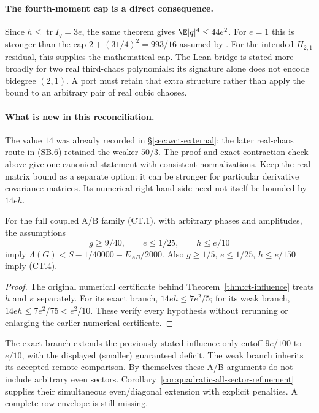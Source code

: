 \paragraph{The fourth-moment cap is a direct consequence.}
Since $h\le\operatorname{tr}I_q=3e$, the same theorem gives
$\E|q|^4\le44e^2$. For $e=1$ this is stronger than the cap
$2+(31/4)^2=993/16$ assumed by .
For the intended $H_{2,1}$ residual, this supplies the mathematical cap.
The Lean bridge is stated more broadly for two real third-chaos
polynomials: its signature alone does not encode bidegree $(2,1)$.
A port must retain that extra structure rather than apply the bound to
an arbitrary pair of real cubic chaoses.

\paragraph{What is new in this reconciliation.}
The value $14$ was already recorded in \S\ref{sec:wct-external}; the later
real-chaos route in (SB.6) retained the weaker $50/3$. The proof and exact
contraction check above give one canonical statement with consistent
normalizations. Keep the real-matrix bound as a separate option: it can
be stronger for particular derivative covariance matrices. Its numerical
right-hand side need not itself be bounded by $14eh$.

\begin{corollary}\label{cor:sharp-influence-region}
For the full coupled A/B family (CT.1), with arbitrary phases and
amplitudes, the assumptions
\[
 g\ge9/40,\qquad e\le1/25,\qquad h\le e/10
\]
imply
$\Lambda(G)<S-1/40000-E_{AB}/2000$.
Also $g\ge1/5$, $e\le1/25$, $h\le e/150$ imply (CT.4).
\end{corollary}
\begin{proof}
The original numerical certificate behind Theorem~\ref{thm:ct-influence} treats $h$ and $\kappa$ separately.
For its exact branch, $14eh\le7e^2/5$; for its weak branch,
$14eh\le7e^2/75<e^2/10$. These verify every hypothesis without
rerunning or enlarging the earlier numerical certificate.
\end{proof}
The exact branch extends the previously stated influence-only cutoff
$9e/100$ to $e/10$, with the displayed (smaller) guaranteed deficit.
The weak branch inherits its accepted remote comparison. By themselves these A/B arguments do not include arbitrary even sectors.
Corollary~\ref{cor:quadratic-all-sector-refinement} supplies their simultaneous
even/diagonal extension with explicit penalties. A complete row envelope
is still missing.
